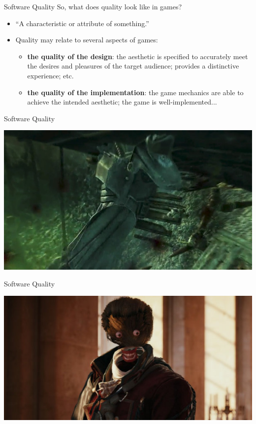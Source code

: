 \begin{frame}{Software Quality}
	So, what does quality look like in games? \pause
	
	\begin{itemize}
		\item ``A characteristic or attribute of something.'' \pause
		\item Quality may relate to several aspects of games: \pause
		\begin{itemize}
			\item \textbf{the quality of the design}: the aesthetic is specified to accurately meet the desires and 
			pleasures of the target audience; provides a distinctive experience; etc. \pause
			\item \textbf{the quality of the implementation}: the game mechanics are able to achieve the intended
			aesthetic; the game is well-implemented...
		\end{itemize}
	\end{itemize}
\end{frame}

\begin{frame}{Software Quality}
	\begin{center}
        \includegraphics[width=\textwidth]{fallout3_collision_bugs.jpg}
    \end{center}
\end{frame}

\begin{frame}{Software Quality}
	\begin{center}
        \includegraphics[width=\textwidth]{ac_graphics_bug.jpg}
    \end{center}
\end{frame}

